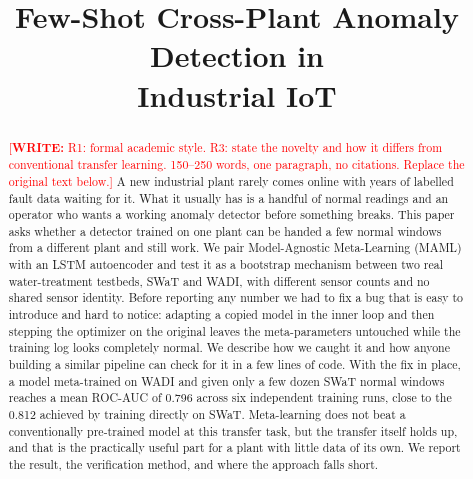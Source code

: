 \documentclass[conference]{IEEEtran}
\newcommand{\authorwrite}[1]{\textcolor{red}{[\textbf{WRITE:} #1]}}
\begin{document}
\title{Few-Shot Cross-Plant Anomaly Detection in\\ Industrial IoT}

\author{
\and
{}
}

\maketitle
\thispagestyle{empty}
\pagestyle{empty}

\begin{abstract}
\authorwrite{R1: formal academic style. R3: state the novelty and how it
differs from conventional transfer learning. 150--250 words, one paragraph,
no citations. Replace the original text below.}
A new industrial plant rarely comes online with years of labelled fault data
waiting for it. What it usually has is a handful of normal readings and an
operator who wants a working anomaly detector before something breaks. This
paper asks whether a detector trained on one plant can be handed a few normal
windows from a different plant and still work. We pair Model-Agnostic
Meta-Learning (MAML) with an LSTM autoencoder and test it as a bootstrap
mechanism between two real water-treatment testbeds, SWaT and WADI, with
different sensor counts and no shared sensor identity. Before reporting any
number we had to fix a bug that is easy to introduce and hard to notice:
adapting a copied model in the inner loop and then stepping the optimizer on
the original leaves the meta-parameters untouched while the training log
looks completely normal. We describe how we caught it and how anyone
building a similar pipeline can check for it in a few lines of code. With
the fix in place, a model meta-trained on WADI and given only a few dozen
SWaT normal windows reaches a mean ROC-AUC of 0.796 across six independent
training runs, close to the 0.812 achieved by training directly on SWaT.
Meta-learning does not beat a conventionally pre-trained model at this
transfer task, but the transfer itself holds up, and that is the
practically useful part for a plant with little data of its own. We report
the result, the verification method, and where the approach falls short.
\end{abstract}
\end{document}
